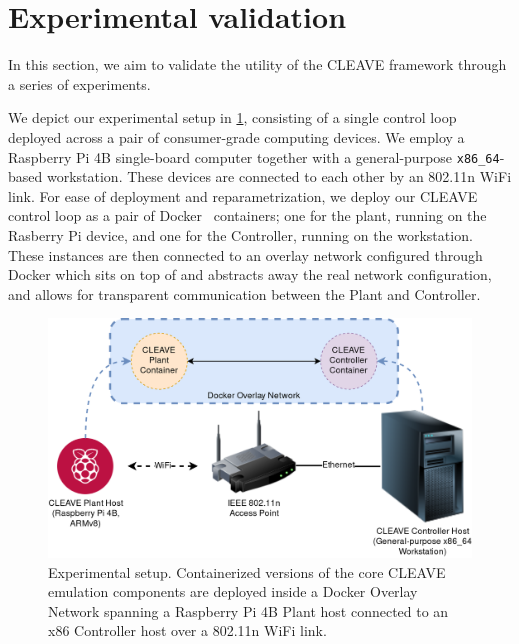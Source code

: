 \section{Experimental validation}\label{sec:experiments}


In this section, we aim to validate the utility of the CLEAVE framework through a series of experiments.


We depict our experimental setup in \cref{fig:cleave:expsetup}, consisting of a single control loop deployed across a pair of consumer-grade computing devices.
We employ a Raspberry Pi 4B single-board computer together with a general-purpose \verb|x86_64|-based workstation.
These devices are connected to each other by an 802.11n WiFi link.
For ease of deployment and reparametrization, we deploy our CLEAVE control loop as a pair of Docker~\cite{merkel2014docker} containers; one for the plant, running on the Rasberry Pi device, and one for the Controller, running on the workstation. 
These instances are then connected to an overlay network configured through Docker which sits on top of and abstracts away the real network configuration, and allows for transparent communication between the Plant and Controller.

\begin{figure}
    \centering
    \includegraphics[width=.95\columnwidth]{images/CLEAVE_experiment_setup}
    \caption{Experimental setup. Containerized versions of the core CLEAVE emulation components are deployed inside a Docker Overlay Network spanning a Raspberry Pi 4B Plant host connected to an x86 Controller host over a 802.11n WiFi link.}\label{fig:cleave:expsetup}
\end{figure}

